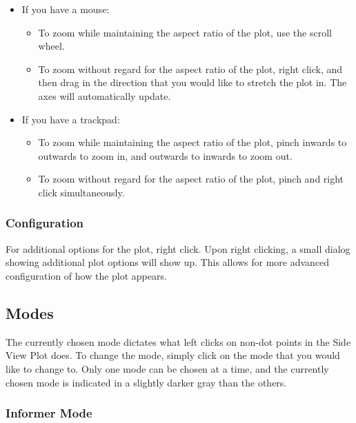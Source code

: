\documentclass[titlepage]{article}
\begin{document}
	\begin{itemize}
		\item If you have a mouse:
			\begin{itemize}
				\item To zoom while maintaining the aspect ratio of the plot, use the scroll wheel.
				\item To zoom without regard for the aspect ratio of the plot, right click, and then drag in the direction that you would like to stretch the plot in. The axes will automatically update.
			\end{itemize}
	
		\item If you have a trackpad:
			\begin{itemize}
				\item To zoom while maintaining the aspect ratio of the plot, pinch inwards to outwards to zoom in, and outwards to inwards to zoom out.
				\item To zoom without regard for the aspect ratio of the plot, pinch and right click simultaneously. 
			\end{itemize}
	\end{itemize}

	\subsubsection{Configuration}
	For additional options for the plot, right click. Upon right clicking, a small dialog showing additional plot options will show up. This allows for more advanced configuration of how the plot appears.
	
	\subsection{Modes}
	The currently chosen mode dictates what left clicks on non-dot points in the Side View Plot does. To change the mode, simply click on the mode that you would like to change to. Only one mode can be chosen at a time, and the currently chosen mode is indicated in a slightly darker gray than the others.
	
	\subsubsection{Informer Mode}
	
\end{document}
